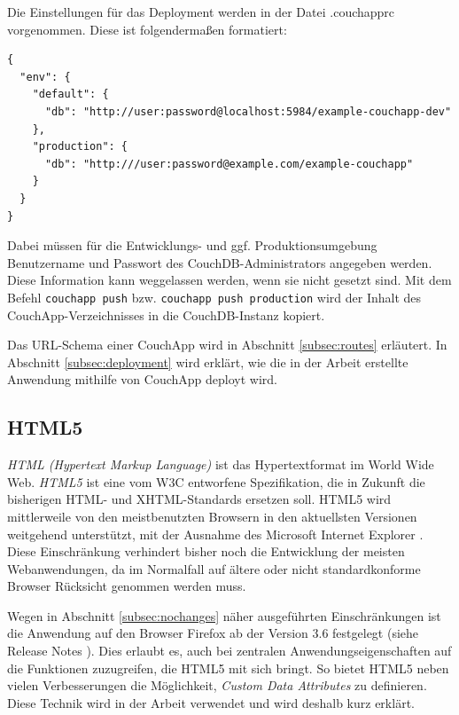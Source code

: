 Die Einstellungen für das Deployment werden in der Datei {\selectfont .couchapprc} vorgenommen. Diese ist folgendermaßen formatiert:

\lstset{language=javascript}
\medskip
\begin{lstlisting}[label=code:couchapprc,caption=Couchapp: .couchapprc]
{
  "env": { 
    "default": {
      "db": "http://user:password@localhost:5984/example-couchapp-dev"
    },
    "production": {
      "db": "http:///user:password@example.com/example-couchapp"
    }
  }
}
\end{lstlisting}


Dabei müssen für die Entwicklungs- und ggf. Produktionsumgebung Benutzername und Passwort des CouchDB-Administrators angegeben werden. Diese Information kann weggelassen werden, wenn sie nicht gesetzt sind. Mit dem Befehl \lstinline!couchapp push! bzw. \lstinline!couchapp push production! wird der Inhalt des CouchApp-Verzeichnisses in die CouchDB-Instanz kopiert.

Das URL-Schema einer CouchApp wird in Abschnitt \ref{subsec:routes} erläutert. In Abschnitt \ref{subsec:deployment} wird erklärt, wie die in der Arbeit erstellte Anwendung mithilfe von CouchApp deployt wird. 


\subsection{HTML5}
\label{subsec:html5}

\textit{HTML (Hypertext Markup Language)} ist das Hypertextformat im World Wide Web. \textit{HTML5} \cite{html5:homepage} ist eine vom W3C entworfene Spezifikation, die in Zukunft die bisherigen HTML- und XHTML-Standards ersetzen soll. HTML5 wird mittlerweile von den meistbenutzten Browsern in den aktuellsten Versionen weitgehend unterstützt, mit der Ausnahme des Microsoft Internet Explorer \cite{html5:browser}. Diese Einschränkung verhindert bisher noch die Entwicklung der meisten Webanwendungen, da im Normalfall auf ältere oder nicht standardkonforme Browser Rücksicht genommen werden muss. 

Wegen in Abschnitt \ref{subsec:nochanges} näher ausgeführten Einschränkungen ist die Anwendung auf den Browser Firefox ab der Version 3.6 festgelegt (siehe Release Notes \cite{firefox36}). Dies erlaubt es, auch bei zentralen Anwendungseigenschaften auf die Funktionen zuzugreifen, die HTML5 mit sich bringt. So bietet HTML5 neben vielen Verbesserungen die Möglichkeit, \textit{Custom Data Attributes} zu definieren. Diese Technik wird in der Arbeit verwendet und wird deshalb kurz erklärt. 

